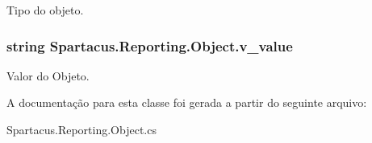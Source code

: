 Tipo do objeto. 

\hypertarget{classSpartacus_1_1Reporting_1_1Object_a7ecbaf47ca365f5b075bb0d7daa00276}{
\subsubsection[{v\+\_\+value}]{\setlength{\rightskip}{0pt plus 5cm}string Spartacus.\+Reporting.\+Object.\+v\+\_\+value}}\label{classSpartacus_1_1Reporting_1_1Object_a7ecbaf47ca365f5b075bb0d7daa00276}


Valor do Objeto. 



A documentação para esta classe foi gerada a partir do seguinte arquivo\+:\begin{DoxyCompactItemize}
\item 
Spartacus.\+Reporting.\+Object.\+cs\end{DoxyCompactItemize}
